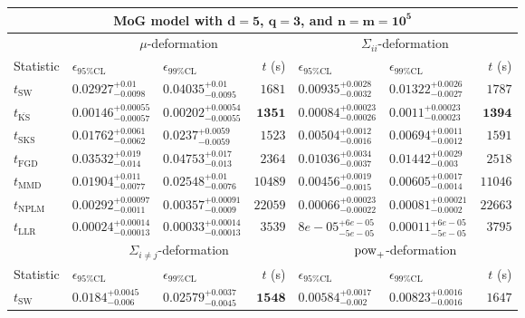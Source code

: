 \begin{tabular}{l|llr|llr}
	\toprule
	\multicolumn{7}{c}{{\bf MoG model with $\mathbf{d=5}$, $\mathbf{q=3}$, and $\mathbf{n=m=10^{5}}$}} \\
	\toprule
	\multicolumn{1}{c}{} & \multicolumn{3}{c}{$\mu$-deformation} & \multicolumn{3}{c}{$\Sigma_{ii}$-deformation} \\
	Statistic & $\epsilon_{95\%\mathrm{CL}}$ & $\epsilon_{99\%\mathrm{CL}}$ & $t$ (s) & $\epsilon_{95\%\mathrm{CL}}$ & $\epsilon_{99\%\mathrm{CL}}$ & $t$ (s) \\
	\midrule
	$t_{\mathrm{SW}}$ & $0.02927_{-0.0098}^{+0.01}$ & $0.04035_{-0.0095}^{+0.01}$ & $1681$ & $0.00935_{-0.0032}^{+0.0028}$ & $0.01322_{-0.0027}^{+0.0026}$ & $1787$ \\
	$t_{\overline{\mathrm{KS}}}$ & ${\mathbf{0.00146_{-0.00057}^{+0.00055}}}$ & ${\mathbf{0.00202_{-0.00055}^{+0.00054}}}$ & ${\mathbf{1351}}$ & ${\mathbf{0.00084_{-0.00026}^{+0.00023}}}$ & ${\mathbf{0.0011_{-0.00023}^{+0.00023}}}$ & ${\mathbf{1394}}$ \\
	$t_{\mathrm{SKS}}$ & $0.01762_{-0.0062}^{+0.0061}$ & $0.0237_{-0.0059}^{+0.0059}$ & $1523$ & $0.00504_{-0.0016}^{+0.0012}$ & $0.00694_{-0.0012}^{+0.0011}$ & $1591$ \\
	$t_{\mathrm{FGD}}$ & $0.03532_{-0.014}^{+0.019}$ & $0.04753_{-0.013}^{+0.017}$ & $2364$ & $0.01036_{-0.0037}^{+0.0034}$ & $0.01442_{-0.003}^{+0.0029}$ & $2518$ \\
	$t_{\mathrm{MMD}}$ & $0.01904_{-0.0077}^{+0.011}$ & $0.02548_{-0.0076}^{+0.01}$ & $10489$ & $0.00456_{-0.0015}^{+0.0019}$ & $0.00605_{-0.0014}^{+0.0017}$ & $11046$ \\
\rowcolor{red!35}	$t_{\mathrm{NPLM}}$ & $0.00292_{-0.0011}^{+0.00097}$ & $0.00357_{-0.0009}^{+0.00091}$ & $22059$ & $0.00066_{-0.00022}^{+0.00023}$ & $0.00081_{-0.0002}^{+0.00021}$ & $22663$ \\
	$t_{\mathrm{LLR}}$ & $0.00024_{-0.00013}^{+0.00014}$ & $0.00033_{-0.00013}^{+0.00014}$ & $3539$ & $8e-05_{-5e-05}^{+6e-05}$ & $0.00011_{-5e-05}^{+6e-05}$ & $3795$ \\
	\toprule
	\multicolumn{1}{c}{} & \multicolumn{3}{c}{$\Sigma_{i\neq j}$-deformation} & \multicolumn{3}{c}{$\rm{pow}_{+}$-deformation} \\
	Statistic & $\epsilon_{95\%\mathrm{CL}}$ & $\epsilon_{99\%\mathrm{CL}}$ & $t$ (s) & $\epsilon_{95\%\mathrm{CL}}$ & $\epsilon_{99\%\mathrm{CL}}$ & $t$ (s) \\
	\midrule
	$t_{\mathrm{SW}}$ & $0.0184_{-0.006}^{+0.0045}$ & $0.02579_{-0.0045}^{+0.0037}$ & ${\mathbf{1548}}$ & $0.00584_{-0.002}^{+0.0017}$ & $0.00823_{-0.0016}^{+0.0016}$ & $1647$ \\

\end{tabular}
